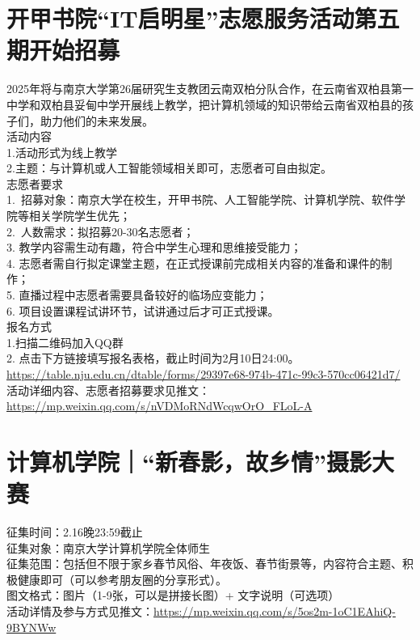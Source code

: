 \documentclass[letterpaper, 12pt]{article}
\begin{document}
\begin{multicols}{2}
\section{开甲书院“IT启明星”志愿服务活动第五期开始招募}
2025年将与南京大学第26届研究生支教团云南双柏分队合作，在云南省双柏县第一中学和双柏县妥甸中学开展线上教学，把计算机领域的知识带给云南省双柏县的孩子们，助力他们的未来发展。\\
活动内容\\
1.活动形式为线上教学\\
2.主题：与计算机或人工智能领域相关即可，志愿者可自由拟定。\\
志愿者要求\\
1. 招募对象：南京大学在校生，开甲书院、人工智能学院、计算机学院、软件学院等相关学院学生优先；\\
2. 人数需求：拟招募20-30名志愿者；\\
3. 教学内容需生动有趣，符合中学生心理和思维接受能力；\\
4. 志愿者需自行拟定课堂主题，在正式授课前完成相关内容的准备和课件的制作；\\
5. 直播过程中志愿者需要具备较好的临场应变能力；\\
6. 项目设置课程试讲环节，试讲通过后才可正式授课。\\
报名方式\\
1.扫描二维码加入QQ群\\
2. 点击下方链接填写报名表格，截止时间为2月10日24:00。\url{https://table.nju.edu.cn/dtable/forms/29397e68-974b-471c-99c3-570cc06421d7/}\\
 活动详细内容、志愿者招募要求见推文：\url{https://mp.weixin.qq.com/s/nVDMoRNdWcqwOrO_FLoL-A}\\


\section{计算机学院｜“新春影，故乡情”摄影大赛}
征集时间：2.16晚23:59截止\\
征集对象：南京大学计算机学院全体师生\\
征集范围：包括但不限于家乡春节风俗、年夜饭、春节街景等，内容符合主题、积极健康即可（可以参考朋友圈的分享形式）。\\
图文格式：图片（1-9张，可以是拼接长图）+ 文字说明（可选项）\\
活动详情及参与方式见推文：\url{https://mp.weixin.qq.com/s/5os2m-1oC1EAhiQ-9BYNWw}\\


\end{multicols}
\end{document}
